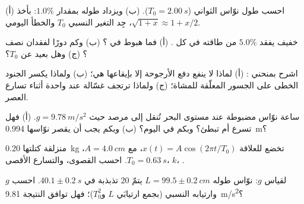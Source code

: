 \begin{exercise}[$\star\star$]\label{exo:g12:oscillators-and-time:9}
(أ) احسب طول نوّاس الثواني ($T_0 =
\qty{2.00}{s}$). (ب) ويزداد طوله بمقدار $1.0\%$: بأخذ $\sqrt{1+x}
\approx 1 + x/2$، جِد التغير النسبي  $T_0$ والخطأ اليومي.
\end{exercise}

\begin{exercise}[$\star\star$]\label{exo:g12:oscillators-and-time:10}
 خفيف  يفقد $5.0\%$ من طاقته في كل .
(أ) فما هبوط  في ؟ (ب) وكم دورًا لفقدان نصف
؟ (ج) وهل  بعيد عن $T_0$؟
\end{exercise}

\begin{exercise}[$\star\star$]\label{exo:g12:oscillators-and-time:11}
اشرح بمنحني : (أ) لماذا لا ينفع دفع الأرجوحة إلا
بإيقاعها هي؛ (ب) ولماذا يكسر الجنود الخطى على الجسور المعلّقة للمشاة؛ (ج)
ولماذا ترتجف غسّالة عند  واحدة أثناء تسارع العصر.
\end{exercise}

\begin{exercise}[$\star\star\star$]\label{exo:g12:oscillators-and-time:12}
ساعة نوّاس مضبوطة عند مستوى البحر تُنقل إلى مرصد حيث
$g = \qty{9.78}{m/s^2}$. (أ) فهل تسرع أم تبطئ؟ وبكم  في
اليوم؟ (ب) وبكم يجب أن يقصر نوّاسها \qty{0.994}{m}؟
\end{exercise}

\begin{exercise}[$\star\star\star$]\label{exo:g12:oscillators-and-time:13}
منزلقة كتلتها \qty{0.20}{kg} تخضع للعلاقة $x(t) = A\cos(2\pi t/T_0)$، مع $A =
\qty{4.0}{cm}$، $T_0 = \qty{0.63}{s}$. احسب  القصوى، والتسارع
الأقصى،  $k$، .
\end{exercise}

\begin{exercise}[$\star\star\star$]\label{exo:g12:oscillators-and-time:14}
لقياس $g$: نوّاس طوله $L = 99.5 \pm \qty{0.2}{cm}$ يتمّ
$20$ تذبذبة في $40.1 \pm \qty{0.2}{s}$. احسب $g$ وارتيابه
النسبي (بجمع ارتيابَي $L$ و$T_0^2$)؛ فهل توافق النتيجة
\qty{9.81}{m/s^2}؟
\end{exercise}

